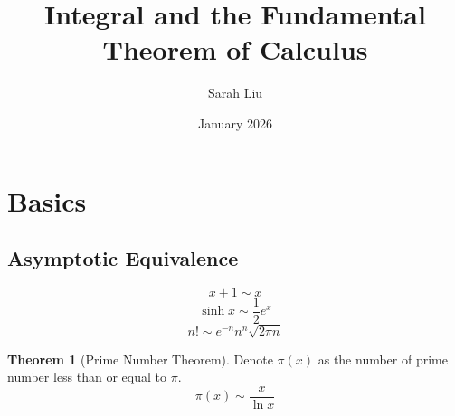\documentclass{article}
\title{Integral and the Fundamental Theorem of Calculus}
\author{Sarah Liu}
\date{January 2026}
\theoremstyle{definition}
\newtheorem{theorem}{Theorem}[section]
\theoremstyle{remark}
\begin{document}
\maketitle

\section{Basics}
\subsection{Asymptotic Equivalence}
\[
x+1\sim x
\]
\[
\sinh x \sim \frac{1}{2}e^x
\]
\[
n!\sim e^{-n}n^n\sqrt{2\pi n}
\]
\begin{theorem}[Prime Number Theorem]
    Denote $\pi(x)$ as the number of prime number less than or equal to $\pi$.
    \[
    \pi(x)\sim\frac{x}{\ln x}
    \]
\end{theorem}
\end{document}
